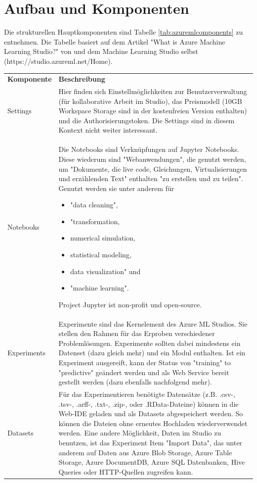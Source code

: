 \section{Aufbau und Komponenten}\label{sec:auK1}
Die strukturellen Hauptkomponenten sind Tabelle \ref{tab:azuremlcomponents} zu entnehmen. Die Tabelle basiert auf dem Artikel "What is Azure Machine Learning Studio?" von \citep{ericson_what_2017} und dem Machine Learning Studio selbst (https://studio.azureml.net/Home).
\begin{longtable}[H]{|p{}|p{14cm}|}
\hline
\textbf{Komponente} & \textbf{Beschreibung}\\ 
\hhline{==}
Settings & Hier finden sich Einstellmöglichkeiten zur Benutzerverwaltung (für kollaborative Arbeit im Studio), das Preismodell (10GB Workspace Storage sind in der kostenfreien Version enthalten) und die Authorisierungstoken. Die Settings sind in diesem Kontext nicht weiter interessant. \\
\hline
Notebooks & Die Notebooks sind Verknüpfungen auf Jupyter Notebooks. Diese wiederum sind "Webanwendungen", die genutzt werden, um "Dokumente, die live code, Gleichungen, Virtualisierungen und erzählenden Text" enthalten "zu erstellen und zu teilen". Genutzt werden sie unter anderem für 
\begin{itemize}
\item "data cleaning",
\item "transformation,
\item numerical simulation,
\item statistical modeling,
\item data visualization" und
\item "machine learning"\citep{projectjupyter_jupyter_2017}.
\end{itemize}
Project Jupyter ist non-profit und open-source.\citep{projectjupyter_about_2017} \\
\hline
Experiments & Experimente sind das Kernelement des Azure ML Studios. Sie stellen den Rahmen für das Erproben verschiedener Problemlösungen. Experimente sollten dabei mindestens ein Datenset (dazu gleich mehr) und ein Modul enthalten. Ist ein Experiment ausgereift, kann der Status von "training" to "predictive" geändert werden und als Web Service bereit gestellt werden (dazu ebenfalls nachfolgend mehr).\\
\hline
Datasets & Für das Experimentieren benötigte Datensätze (z.B. .csv-, .tsv-, .arff-, .txt-, .zip-, oder .RData-Dateine) können in die Web-IDE geladen und als Datasets abgespeichert werden. So können die Dateien ohne erneutes Hochladen wiederverwendet werden. Eine andere Möglichkeit, Daten im Studio zu benutzen, ist das Experiment Item "Import Data", das unter anderem auf Daten aus Azure Blob Storage, Azure Table Storage, Azure DocumentDB, Azure SQL Datenbanken, Hive Queries oder HTTP-Quellen zugreifen kann.\\

\end{longtable}
